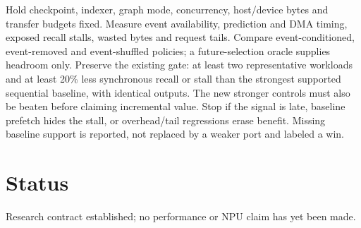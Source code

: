 \documentclass[sigconf,review,anonymous]{acmart}
\begin{document}
Hold checkpoint, indexer, graph mode, concurrency, host/device bytes and
transfer budgets fixed. Measure event availability, prediction and DMA timing,
exposed recall stalls, wasted bytes and request tails. Compare event-conditioned,
event-removed and event-shuffled policies; a future-selection oracle supplies
headroom only. Preserve the existing gate: at least two representative
workloads and at least 20\% less synchronous recall or stall than the strongest
supported sequential baseline, with identical outputs. The new stronger
controls must also be beaten before claiming incremental value. Stop if the
signal is late, baseline prefetch hides the stall, or overhead/tail regressions
erase benefit. Missing baseline support is reported, not replaced by a weaker
port and labeled a win.

\section{Status}
Research contract established; no performance or NPU claim has yet been made.


\end{document}
